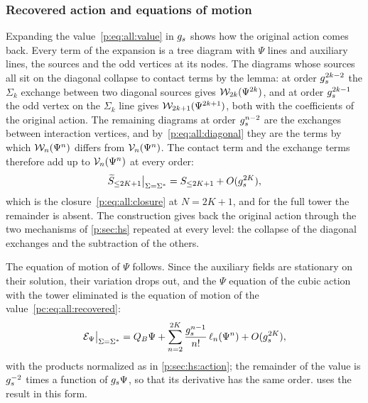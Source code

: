\subsubsection{Recovered action and equations of motion}
\label{pc:sec:all:integrating-out}

Expanding the value~\eqref{p:eq:all:value} in $\gs$ shows how the original action comes back.
Every term of the expansion is a tree diagram with $\Psi$ lines and auxiliary lines, the sources and the odd vertices at its nodes.
The diagrams whose sources all sit on the diagonal collapse to contact terms by the lemma: at order $\gs^{2 k - 2}$ the $\Sigma_k$ exchange between two diagonal sources gives $\dvertex{2 k}(\Psi^{2 k})$, and at order $\gs^{2 k - 1}$ the odd vertex on the $\Sigma_k$ line gives $\dvertex{2 k + 1}(\Psi^{2 k + 1})$, both with the coefficients of the original action.
The remaining diagrams at order $\gs^{n - 2}$ are the exchanges between interaction vertices, and by~\eqref{p:eq:all:diagonal} they are the terms by which $\dvertex{n}(\Psi^n)$ differs from $\vertex{n}(\Psi^n)$.
The contact term and the exchange terms therefore add up to $\vertex{n}(\Psi^n)$ at every order:
\begin{equation}
  \label{pc:eq:all:recovered}
  \caction[\le 2 K + 1] \big|_{\Sigma = \Sigma^*}
    = S_{\le 2 K + 1} + O(\gs^{2 K}),
\end{equation}
which is the closure~\eqref{p:eq:all:closure} at $N = 2 K + 1$, and for the full tower the remainder is absent.
The construction gives back the original action through the two mechanisms of \cref{p:sec:hs} repeated at every level: the collapse of the diagonal exchanges and the subtraction of the others.

The equation of motion of $\Psi$ follows.
Since the auxiliary fields are stationary on their solution, their variation drops out, and the $\Psi$ equation of the cubic action with the tower eliminated is the equation of motion of the value~\eqref{pc:eq:all:recovered}:
\begin{equation}
  \label{pc:eq:all:eom-recovered}
  \mathcal E_\Psi \big|_{\Sigma = \Sigma^*}
    = Q_B \Psi + \sum_{n = 2}^{2 K} \frac{\gs^{n - 1}}{n!} \, \ell_n(\Psi^n) + O(\gs^{2 K}),
\end{equation}
with the products normalized as in \cref{p:sec:hs:action}; the remainder of the value is $\gs^{-2}$ times a function of $\gs \Psi$, so that its derivative has the same order.
 uses the result in this form.

